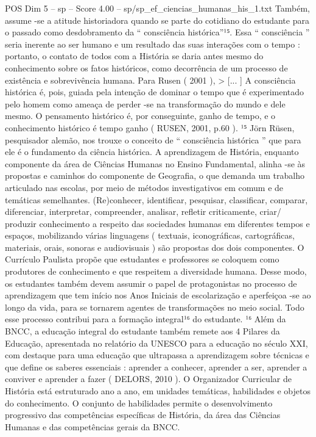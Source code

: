 \begin{textsample}{POS Dim 5 – sp – Score 4.00 – sp/sp\_ef\_ciencias\_humanas\_his\_1.txt}
Também, assume -se a atitude historiadora quando se parte do cotidiano do estudante para o passado como desdobramento da “ consciência histórica”¹⁵.
Essa “ consciência ” seria inerente ao ser humano e um resultado das suas interações com o tempo : portanto, o contato de todos com a História se daria antes mesmo do conhecimento sobre os fatos históricos, como decorrência de um processo de existência e sobrevivência humana.
Para Rusen ( 2001 ), > [... ] A consciência histórica é, pois, guiada pela intenção de dominar o tempo que é experimentado pelo homem como ameaça de perder -se na transformação do mundo e dele mesmo.
O pensamento histórico é, por conseguinte, ganho de tempo, e o conhecimento histórico é tempo ganho ( RUSEN, 2001, p.60 ). ¹⁵ Jörn Rüsen, pesquisador alemão, nos trouxe o conceito de “ consciência histórica ” que para ele é o fundamento da ciência histórica.
A aprendizagem de História, enquanto componente da área de Ciências Humanas no Ensino Fundamental, alinha -se às propostas e caminhos do componente de Geografia, o que demanda um trabalho articulado nas escolas, por meio de métodos investigativos em comum e de temáticas semelhantes. (Re)conhecer, identificar, pesquisar, classificar, comparar, diferenciar, interpretar, compreender, analisar, refletir criticamente, criar/ produzir conhecimento a respeito das sociedades humanas em diferentes tempos e espaços, mobilizando várias linguagens ( textuais, iconográficas, cartográficas, materiais, orais, sonoras e audiovisuais ) são propostas dos dois componentes.
O Currículo Paulista propõe que estudantes e professores se coloquem como produtores de conhecimento e que respeitem a diversidade humana.
Desse modo, os estudantes também devem assumir o papel de protagonistas no processo de aprendizagem que tem início nos Anos Iniciais de escolarização e aperfeiçoa -se ao longo da vida, para se tornarem agentes de transformações no meio social.
Todo esse processo contribui para a formação integral¹⁶ do estudante. ¹⁶ Além da BNCC, a educação integral do estudante também remete aos 4 Pilares da Educação, apresentada no relatório da UNESCO para a educação no século XXI, com destaque para uma educação que ultrapassa a aprendizagem sobre técnicas e que define os saberes essenciais : aprender a conhecer, aprender a ser, aprender a conviver e aprender a fazer ( DELORS, 2010 ).
O Organizador Curricular de História está estruturado ano a ano, em unidades temáticas, habilidades e objetos do conhecimento.
O conjunto de habilidades permite o desenvolvimento progressivo das competências específicas de História, da área das Ciências Humanas e das competências gerais da BNCC.

\end{textsample}

